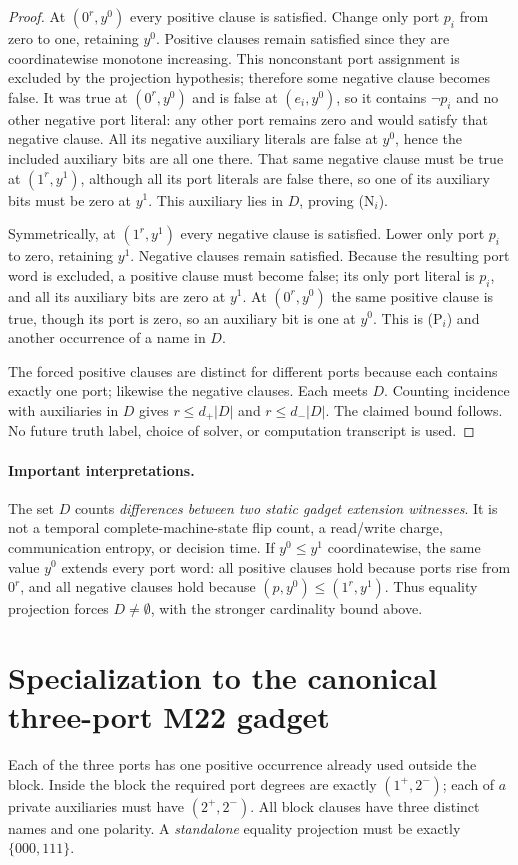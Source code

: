 \documentclass[11pt]{article}
\begin{document}
\begin{proof}
At $(0^r,y^0)$ every positive clause is satisfied. Change only port $p_i$ from zero to one, retaining $y^0$. Positive clauses remain satisfied since they are coordinatewise monotone increasing. This nonconstant port assignment is excluded by the projection hypothesis; therefore some negative clause becomes false. It was true at $(0^r,y^0)$ and is false at $(e_i,y^0)$, so it contains $\neg p_i$ and no other negative port literal: any other port remains zero and would satisfy that negative clause. All its negative auxiliary literals are false at $y^0$, hence the included auxiliary bits are all one there. That same negative clause must be true at $(1^r,y^1)$, although all its port literals are false there, so one of its auxiliary bits must be zero at $y^1$. This auxiliary lies in $D$, proving (N$_i$).

Symmetrically, at $(1^r,y^1)$ every negative clause is satisfied. Lower only port $p_i$ to zero, retaining $y^1$. Negative clauses remain satisfied. Because the resulting port word is excluded, a positive clause must become false; its only port literal is $p_i$, and all its auxiliary bits are zero at $y^1$. At $(0^r,y^0)$ the same positive clause is true, though its port is zero, so an auxiliary bit is one at $y^0$. This is (P$_i$) and another occurrence of a name in $D$.

The forced positive clauses are distinct for different ports because each contains exactly one port; likewise the negative clauses. Each meets $D$. Counting incidence with auxiliaries in $D$ gives $r\le d_+|D|$ and $r\le d_-|D|$. The claimed bound follows. No future truth label, choice of solver, or computation transcript is used.
\end{proof}

\paragraph{Important interpretations.}
The set $D$ counts \emph{differences between two static gadget extension witnesses}. It is not a temporal complete-machine-state flip count, a read/write charge, communication entropy, or decision time. If $y^0\le y^1$ coordinatewise, the same value $y^0$ extends every port word: all positive clauses hold because ports rise from $0^r$, and all negative clauses hold because $(p,y^0)\le(1^r,y^1)$. Thus equality projection forces $D\ne\emptyset$, with the stronger cardinality bound above.

\section{Specialization to the canonical three-port M22 gadget}
Each of the three ports has one positive occurrence already used outside the block. Inside the block the required port degrees are exactly $(1^+,2^-)$; each of $a$ private auxiliaries must have $(2^+,2^-)$. All block clauses have three distinct names and one polarity. A \emph{standalone} equality projection must be exactly $\{000,111\}$.
\end{document}

